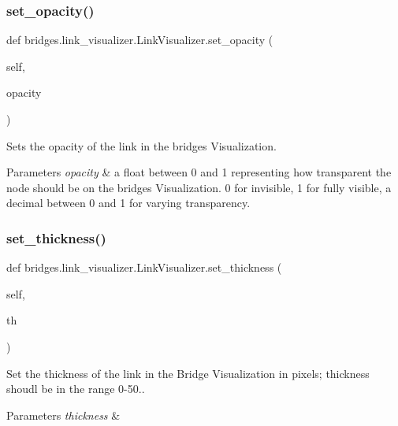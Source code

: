 \subsubsection{\texorpdfstring{set\+\_\+opacity()}{set\_opacity()}}
{\footnotesize\ttfamily def bridges.\+link\+\_\+visualizer.\+Link\+Visualizer.\+set\+\_\+opacity (\begin{DoxyParamCaption}\item[{}]{self,  }\item[{}]{opacity }\end{DoxyParamCaption})}



Sets the opacity of the link in the bridges Visualization. 


\begin{DoxyParams}{Parameters}
{\em opacity} & a float between 0 and 1 representing how transparent the node should be on the bridges Visualization. 0 for invisible, 1 for fully visible, a decimal between 0 and 1 for varying transparency. \\
\hline
\end{DoxyParams}
\mbox{\label{classbridges_1_1link__visualizer_1_1_link_visualizer_a796fabc8a96348dcc66ba41d9fe19d06}} 
\subsubsection{\texorpdfstring{set\+\_\+thickness()}{set\_thickness()}}
{\footnotesize\ttfamily def bridges.\+link\+\_\+visualizer.\+Link\+Visualizer.\+set\+\_\+thickness (\begin{DoxyParamCaption}\item[{}]{self,  }\item[{}]{th }\end{DoxyParamCaption})}



Set the thickness of the link in the Bridge Visualization in pixels; thickness shoudl be in the range 0-\/50.. 


\begin{DoxyParams}{Parameters}
{\em thickness} & \\
\hline
\end{DoxyParams}
\mbox{\label{classbridges_1_1link__visualizer_1_1_link_visualizer_a0c3f7475849e664afee31cb836ffe4da}} 
